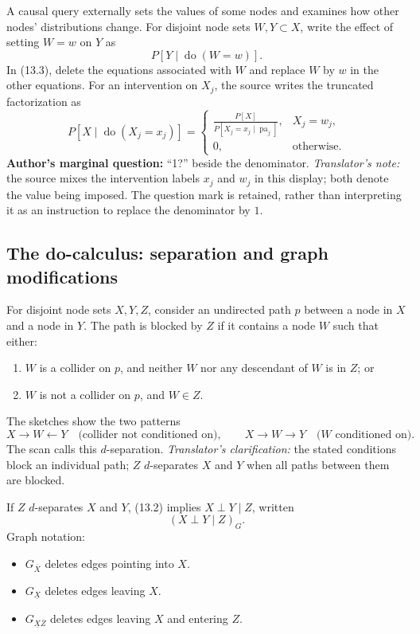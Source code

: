 A causal query externally sets the values of some nodes and examines how other nodes' distributions change. For disjoint node sets $W,Y\subset X$, write the effect of setting $W=w$ on $Y$ as
\[
 P[Y\mid\operatorname{do}(W=w)].
\]
In (13.3), delete the equations associated with $W$ and replace $W$ by $w$ in the other equations. For an intervention on $X_j$, the source writes the truncated factorization as
\[
 P[X\mid\operatorname{do}(X_j=x_j)]
 =\begin{cases}
 \displaystyle\frac{P[X]}{P[X_j=x_j\mid\operatorname{pa}_j]},&X_j=w_j,\\
 0,&\text{otherwise}.
 \end{cases}
\]
\textbf{Author's marginal question:} ``1?'' beside the denominator.
\textit{Translator's note:} the source mixes the intervention labels $x_j$ and $w_j$ in this display; both denote the value being imposed. The question mark is retained, rather than interpreting it as an instruction to replace the denominator by $1$.

\subsection{The do-calculus: separation and graph modifications}
For disjoint node sets $X,Y,Z$, consider an undirected path $p$ between a node in $X$ and a node in $Y$. The path is blocked by $Z$ if it contains a node $W$ such that either:
\begin{enumerate}
 \item $W$ is a collider on $p$, and neither $W$ nor any descendant of $W$ is in $Z$; or
 \item $W$ is not a collider on $p$, and $W\in Z$.
\end{enumerate}
The sketches show the two patterns
\[
 X\longrightarrow W\longleftarrow Y
 \quad\text{(collider not conditioned on)},
 \qquad
 X\longrightarrow W\longrightarrow Y
 \quad\text{($W$ conditioned on)}.
\]
The scan calls this $d$-separation. \textit{Translator's clarification:} the stated conditions block an individual path; $Z$ $d$-separates $X$ and $Y$ when all paths between them are blocked.

If $Z$ $d$-separates $X$ and $Y$, (13.2) implies $X\perp Y\mid Z$, written
\[
 (X\perp Y\mid Z)_G.
\]
Graph notation:
\begin{itemize}
 \item $G_{\overline X}$ deletes edges pointing into $X$.
 \item $G_{\underline X}$ deletes edges leaving $X$.
 \item $G_{\underline X\overline Z}$ deletes edges leaving $X$ and entering $Z$.
\end{itemize}

